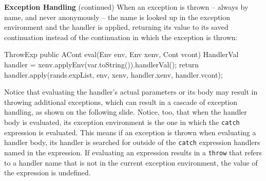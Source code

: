 \begin{minipage}[t]{\sw}
\slidenumber
\LARGE
{\bf Exception Handling} (continued)\exx
When an exception is thrown --
always by name, and never anonymously --
the name is looked up in the exception environment
and the handler is applied,
returning its value to its saved continuation instead
of the continuation in which the exception is thrown:
\large
\begin{qv}
ThrowExp
    public ACont eval(Env env, Env xenv, Cont vcont) {
        HandlerVal handler =
            xenv.applyEnv(var.toString()).handlerVal();
        return handler.apply(rands.expList, env, xenv,
                             handler.xenv, handler.vcont);
    }
\end{qv}
\LARGE
Notice that evaluating the handler's actual parameters
or its body
may result in throwing additional exceptions,
which can result in a cascade
of exception handling, as shown on the following slide.
Notice, too, that when the handler body is evaluated,
its exception environment is the one
in which the \verb'catch' expression is evaluated.
This means if an exception is thrown
when evaluating a handler body,
its handler is searched for outside
of the \verb'catch' expression handlers named in the expression.
If evaluating an expression results
in a \verb'throw' that refers to a handler name
that is not in the current exception environment,
the value of the expression is undefined.
\end{minipage}
